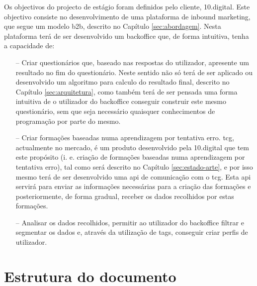 Os objectivos do projecto de estágio foram definidos pelo cliente, 10.digital. Este objectivo consiste no desenvolvimento de uma plataforma de inbound marketing, que segue um modelo \gls{b2b}, descrito no Capítulo \ref{sec:abordagem}. Nesta plataforma terá de ser desenvolvido um \gls{backoffice} que, de forma intuitiva, tenha a capacidade de:
\begin{itemize}
	\item[--] Criar questionários que, baseado nas respostas do utilizador, apresente um resultado no fim do questionário. Neste sentido não só terá de ser aplicado ou desenvolvido um algoritmo para calculo do resultado final, descrito no Capítulo \ref{sec:arquitetura}, como também terá de ser pensada uma forma intuitiva de o utilizador do \gls{backoffice} conseguir construir este mesmo questionário, sem que seja necessário quaisquer conhecimentos de programação por parte do mesmo.
	\item[--] Criar formações baseadas numa aprendizagem por tentativa erro. \acrfull{tcg}\cite{tcg}, actualmente no mercado, é um produto desenvolvido pela 10.digital que tem este propósito (i. e. criação de formações baseadas numa aprendizagem por tentativa erro), tal como será descrito no Capítulo \ref{sec:estado-arte}, e por isso mesmo terá de ser desenvolvido uma \acrshort{api} de comunicação com o \acrshort{tcg}. Esta \acrshort{api} servirá para enviar as informações necessárias para a criação das formações e posteriormente, de forma gradual, receber os dados recolhidos por estas formações. 
	\item[--] Analisar os dados recolhidos, permitir ao utilizador do \gls{backoffice} filtrar e segmentar os dados e, através da utilização de \gls{tags}, conseguir criar perfis de utilizador.
\end{itemize}



\section{Estrutura do documento}
\label{subsec:estrutura}


